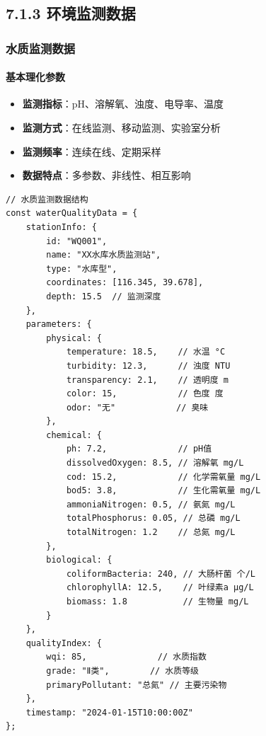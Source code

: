 \subsection{7.1.3
环境监测数据}\label{ux73afux5883ux76d1ux6d4bux6570ux636e}

\subsubsection{水质监测数据}\label{ux6c34ux8d28ux76d1ux6d4bux6570ux636e}

\paragraph{基本理化参数}\label{ux57faux672cux7406ux5316ux53c2ux6570}

\begin{itemize}
\tightlist
\item
  \textbf{监测指标}：pH、溶解氧、浊度、电导率、温度
\item
  \textbf{监测方式}：在线监测、移动监测、实验室分析
\item
  \textbf{监测频率}：连续在线、定期采样
\item
  \textbf{数据特点}：多参数、非线性、相互影响
\end{itemize}

\begin{lstlisting}
// 水质监测数据结构
const waterQualityData = {
    stationInfo: {
        id: "WQ001",
        name: "XX水库水质监测站",
        type: "水库型",
        coordinates: [116.345, 39.678],
        depth: 15.5  // 监测深度
    },
    parameters: {
        physical: {
            temperature: 18.5,    // 水温 °C
            turbidity: 12.3,      // 浊度 NTU
            transparency: 2.1,    // 透明度 m
            color: 15,            // 色度 度
            odor: "无"            // 臭味
        },
        chemical: {
            ph: 7.2,              // pH值
            dissolvedOxygen: 8.5, // 溶解氧 mg/L
            cod: 15.2,            // 化学需氧量 mg/L
            bod5: 3.8,            // 生化需氧量 mg/L
            ammoniaNitrogen: 0.5, // 氨氮 mg/L
            totalPhosphorus: 0.05, // 总磷 mg/L
            totalNitrogen: 1.2    // 总氮 mg/L
        },
        biological: {
            coliformBacteria: 240, // 大肠杆菌 个/L
            chlorophyllA: 12.5,    // 叶绿素a μg/L
            biomass: 1.8           // 生物量 mg/L
        }
    },
    qualityIndex: {
        wqi: 85,              // 水质指数
        grade: "Ⅱ类",        // 水质等级
        primaryPollutant: "总氮" // 主要污染物
    },
    timestamp: "2024-01-15T10:00:00Z"
};
\end{lstlisting}


